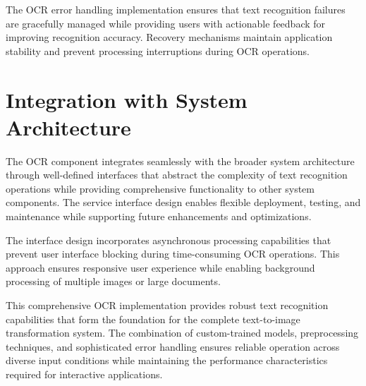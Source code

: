 The OCR error handling implementation ensures that text recognition failures are gracefully managed while providing users with actionable feedback for improving recognition accuracy. Recovery mechanisms maintain application stability and prevent processing interruptions during OCR operations.

\section{Integration with System Architecture}

The OCR component integrates seamlessly with the broader system architecture through well-defined interfaces that abstract the complexity of text recognition operations while providing comprehensive functionality to other system components. The service interface design enables flexible deployment, testing, and maintenance while supporting future enhancements and optimizations.

The interface design incorporates asynchronous processing capabilities that prevent user interface blocking during time-consuming OCR operations. This approach ensures responsive user experience while enabling background processing of multiple images or large documents.

This comprehensive OCR implementation provides robust text recognition capabilities that form the foundation for the complete text-to-image transformation system. The combination of custom-trained models, preprocessing techniques, and sophisticated error handling ensures reliable operation across diverse input conditions while maintaining the performance characteristics required for interactive applications.